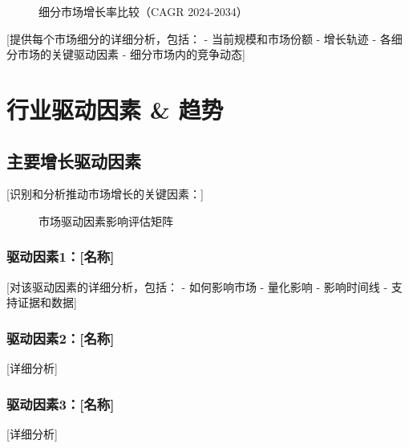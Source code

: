 \documentclass[11pt,letterpaper]{report}
\begin{document}
{\begin{figure}[htbp]
\centering
\caption{细分市场增长率比较（CAGR 2024-2034）}
\label{fig:segment_growth}
\end{figure}

[提供每个市场细分的详细分析，包括：
- 当前规模和市场份额
- 增长轨迹
- 各细分市场的关键驱动因素
- 细分市场内的竞争动态]

\chapter{行业驱动因素 \& 趋势}

\section{主要增长驱动因素}

[识别和分析推动市场增长的关键因素：]


\begin{figure}[htbp]
\centering
\caption{市场驱动因素影响评估矩阵}
\label{fig:driver_matrix}
\end{figure}

\subsection{驱动因素1：[名称]}
[对该驱动因素的详细分析，包括：
- 如何影响市场
- 量化影响
- 影响时间线
- 支持证据和数据]

\subsection{驱动因素2：[名称]}
[详细分析]

\subsection{驱动因素3：[名称]}
[详细分析]

}
\end{document}

